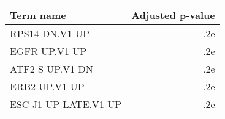 \begin{tabular}{lr}
\toprule
           Term name &  Adjusted p-value \\
\midrule
      RPS14 DN.V1 UP &               .2e \\
       EGFR UP.V1 UP &               .2e \\
     ATF2 S UP.V1 DN &               .2e \\
       ERB2 UP.V1 UP &               .2e \\
ESC J1 UP LATE.V1 UP &               .2e \\
\bottomrule
\end{tabular}
